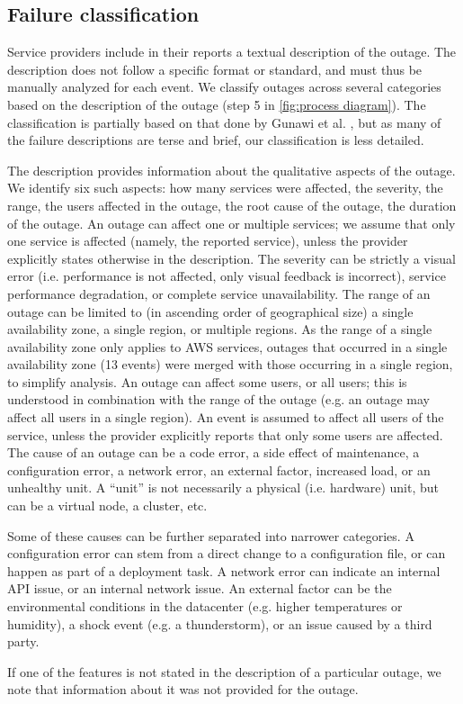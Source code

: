 \subsection{Failure classification}
Service providers include in their reports a textual description of the outage.
The description does not follow a specific format or standard, and must thus be manually analyzed for each event.
We classify outages across several categories based on the description of the outage (step 5 in \autoref{fig:process diagram}).
The classification is partially based on that done by Gunawi et al. \cite{gunawi2016, gunawi2014}, but as many of the failure descriptions are terse and brief, our classification is less detailed.

The description provides information about the qualitative aspects of the outage.
We identify six such aspects: how many services were affected, the severity, the range, the users affected in the outage, the root cause of the outage, the duration of the outage.
An outage can affect one or multiple services; we assume that only one service is affected (namely, the reported service), unless the provider explicitly states otherwise in the description.
The severity can be strictly a visual error (i.e. performance is not affected, only visual feedback is incorrect), service performance degradation, or complete service unavailability.
The range of an outage can be limited to (in ascending order of geographical size) a single availability zone, a single region, or multiple regions.
As the range of a single availability zone only applies to AWS services, outages that occurred in a single availability zone (13 events) were merged with those occurring in a single region, to simplify analysis.
An outage can affect some users, or all users; this is understood in combination with the range of the outage (e.g. an outage may affect all users in a single region).
An event is assumed to affect all users of the service, unless the provider explicitly reports that only some users are affected.
The cause of an outage can be a code error, a side effect of maintenance, a configuration error, a network error, an external factor, increased load, or an unhealthy unit.
A ``unit'' is not necessarily a physical (i.e. hardware) unit, but can be a virtual node, a cluster, etc.

Some of these causes can be further separated into narrower categories.
A configuration error can stem from a direct change to a configuration file, or can happen as part of a deployment task.
A network error can indicate an internal API issue, or an internal network issue.
An external factor can be the environmental conditions in the datacenter (e.g. higher temperatures or humidity), a shock event (e.g. a thunderstorm), or an issue caused by a third party.

If one of the features is not stated in the description of a particular outage, we note that information about it was not provided for the outage.
